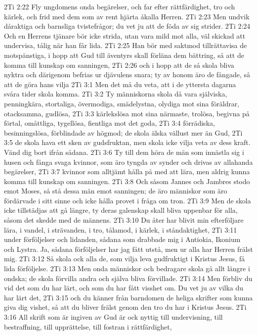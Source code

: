 2Ti 2:22  Fly ungdomens onda begärelser, och far efter rättfärdighet, tro och kärlek, och frid med dem som av rent hjärta åkalla Herren.
2Ti 2:23  Men undvik dåraktiga och barnsliga tvistefrågor; du vet ju att de föda av sig strider.
2Ti 2:24  Och en Herrens tjänare bör icke strida, utan vara mild mot alla, väl skickad att undervisa, tålig när han får lida.
2Ti 2:25  Han bör med saktmod tillrättavisa de motspänstiga, i hopp att Gud till äventyrs skall förläna dem bättring, så att de komma till kunskap om sanningen,
2Ti 2:26  och i hopp att de så skola bliva nyktra och därigenom befrias ur djävulens snara; ty av honom äro de fångade, så att de göra hans vilja
2Ti 3:1  Men det må du veta, att i de yttersta dagarna svåra tider skola komma.
2Ti 3:2  Ty människorna skola då vara själviska, penningkära, stortaliga, övermodiga, smädelystna, olydiga mot sina föräldrar, otacksamma, gudlösa,
2Ti 3:3  kärlekslösa mot sina närmaste, trolösa, begivna på förtal, omåttliga, tygellösa, fientliga mot det goda,
2Ti 3:4  förrädiska, besinningslösa, förblindade av högmod; de skola älska vällust mer än Gud,
2Ti 3:5  de skola hava ett sken av gudsfruktan, men skola icke vilja veta av dess kraft. Vänd dig bort ifrån sådana.
2Ti 3:6  Ty till dem höra de män som innästla sig i husen och fånga svaga kvinnor, som äro tyngda av synder och drivas av allahanda begärelser,
2Ti 3:7  kvinnor som alltjämt hålla på med att lära, men aldrig kunna komma till kunskap om sanningen.
2Ti 3:8  Och såsom Jannes och Jambres stodo emot Moses, så stå dessa män emot sanningen; de äro människor som äro fördärvade i sitt sinne och icke hålla provet i fråga om tron.
2Ti 3:9  Men de skola icke tillstädjas att gå längre, ty deras galenskap skall bliva uppenbar för alla, såsom det skedde med de männens.
2Ti 3:10  Du åter har blivit min efterföljare lära, i vandel, i strävanden, i tro, tålamod, i kärlek, i ståndaktighet,
2Ti 3:11  under förföljelser och lidanden, sådana som drabbade mig i Antiokia, Ikonium och Lystra. Ja, sådana förföljelser har jag fått utstå, men ur alla har Herren frälst mig.
2Ti 3:12  Så skola ock alla de, som vilja leva gudfruktigt i Kristus Jesus, få lida förföljelse.
2Ti 3:13  Men onda människor och bedragare skola gå allt längre i ondska; de skola förvilla andra och själva bliva förvillade.
2Ti 3:14  Men förbliv du vid det som du har lärt, och som du har fått visshet om. Du vet ju av vilka du har lärt det,
2Ti 3:15  och du känner från barndomen de heliga skrifter som kunna giva dig vishet, så att du bliver frälst genom den tro du har i Kristus Jesus.
2Ti 3:16  All skrift som är ingiven av Gud är ock nyttig till undervisning, till bestraffning, till upprättelse, till fostran i rättfärdighet,
